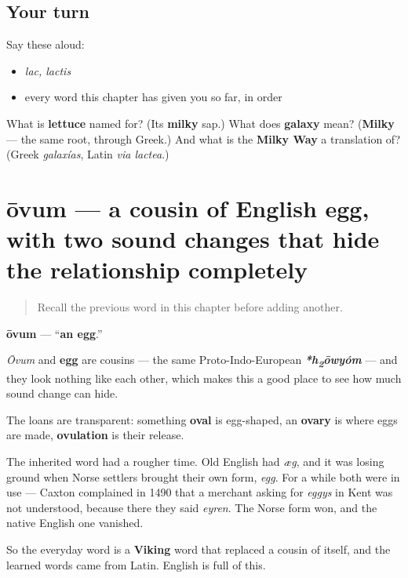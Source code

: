 \subsection*{Your turn}
Say these aloud:

\begin{itemize}
\raggedright
  \item \emph{lac, lactis}
  \item every word this chapter has given you so far, in order
\end{itemize}

\begin{tcolorbox}[breakable,colback=teal!4,colframe=teal!35!black,title={Before you move on}]
What is \textbf{lettuce} named for? (Its \textbf{milky} sap.) What does \textbf{galaxy} mean? (\textbf{Milky} — the same root, through Greek.) And what is the \textbf{Milky Way} a translation of? (Greek \emph{galaxías}, Latin \emph{via lactea}.)
\end{tcolorbox}
\section[ōvum, ōvī]{ōvum — a cousin of English egg, with two sound changes that hide the relationship completely}

\label{lesson:LA-C47-ovum}



\begin{quote}
Recall the previous word in this chapter before adding another.
\end{quote}

\begin{cousinweb}
\textbf{ōvum} — \textquotedblleft{}\textbf{an egg}.\textquotedblright{}

\emph{Ōvum} and \textbf{egg} are cousins — the same Proto-Indo-European \emph{\textbf{*h\textsubscript{2}ōwyóm}} — and they look nothing like each other, which makes this a good place to see how much sound change can hide.

The loans are transparent: something \textbf{oval} is egg-shaped, an \textbf{ovary} is where eggs are made, \textbf{ovulation} is their release.

The inherited word had a rougher time. Old English had \emph{æg}, and it was losing ground when Norse settlers brought their own form, \emph{egg}. For a while both were in use — Caxton complained in 1490 that a merchant asking for \emph{eggys} in Kent was not understood, because there they said \emph{eyren}. The Norse form won, and the native English one vanished.

So the everyday word is a \textbf{Viking} word that replaced a cousin of itself, and the learned words came from Latin. English is full of this.
\end{cousinweb}

